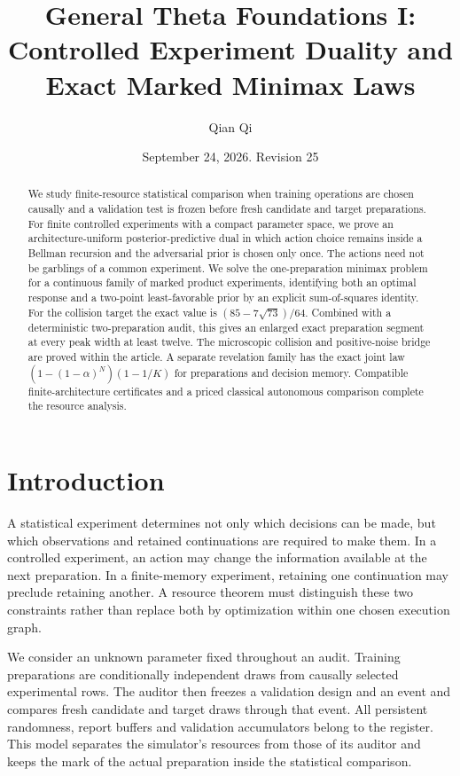 \documentclass[11pt]{amsart}
\title[Controlled statistical minimax]{General Theta Foundations I:\\
Controlled Experiment Duality and Exact Marked Minimax Laws}
\author{Qian Qi}
\date{September 24, 2026. Revision 25}
\theoremstyle{definition}\newtheorem{definition}[theorem]{Definition}
\theoremstyle{remark}\newtheorem{remark}[theorem]{Remark}
\newcommand{\1}{\mathbf 1}
\begin{document}
\begin{abstract}
We study finite-resource statistical comparison when training operations
are chosen causally and a validation test is frozen before fresh candidate
and target preparations. For finite controlled experiments with a compact
parameter space, we prove an architecture-uniform posterior-predictive
dual in which action choice remains inside a Bellman recursion and the
adversarial prior is chosen only once. The actions need not be garblings
of a common experiment. We solve the one-preparation minimax problem
for a continuous family of marked product experiments, identifying both
an optimal response and a two-point least-favorable prior by an explicit
sum-of-squares identity. For the collision target the exact value is
$(85-7\sqrt{73})/64$. Combined with a deterministic two-preparation audit,
this gives an enlarged exact preparation segment at every peak width
at least twelve. The microscopic collision and positive-noise bridge
are proved within the article. A separate revelation family has the
exact joint law $(1-(1-\alpha)^N)(1-1/K)$ for preparations and decision
memory. Compatible finite-architecture certificates and a priced
classical autonomous comparison complete the resource analysis.
\end{abstract}
\maketitle
\tableofcontents

\section{Introduction}
A statistical experiment determines not only which decisions can be
made, but which observations and retained continuations are required to
make them. In a controlled experiment, an action may change the
information available at the next preparation. In a finite-memory
experiment, retaining one continuation may preclude retaining another.
A resource theorem must distinguish these two constraints rather than
replace both by optimization within one chosen execution graph.

We consider an unknown parameter fixed throughout an audit. Training
preparations are conditionally independent draws from causally selected
experimental rows. The auditor then freezes a validation design and an
event and compares fresh candidate and target draws through that event.
All persistent randomness, report buffers and validation accumulators
belong to the register. This model separates the simulator's resources
from those of its auditor and keeps the mark of the actual preparation
inside the statistical comparison.
\end{document}
